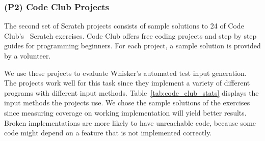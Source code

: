 \subsubsection{(P2) Code Club Projects}

The second set of Scratch projects consists of sample solutions to 24 of Code Club's~\cite{codeclub} Scratch exercises.
Code Club offers free coding projects and step by step guides for programming beginners.
For each project, a sample solution is provided by a volunteer.
\parspace

We use these projects to evaluate Whisker's automated test input generation.
The projects work well for this task since they implement a variety of different programs with different input methods.
Table~\ref{tab:code_club_stats} displays the input methods the projects use.
We chose the sample solutions of the exercises since measuring coverage on working implementation will yield better results.
Broken implementations are more likely to have unreachable code,
because some code might depend on a feature that is not implemented correctly.

